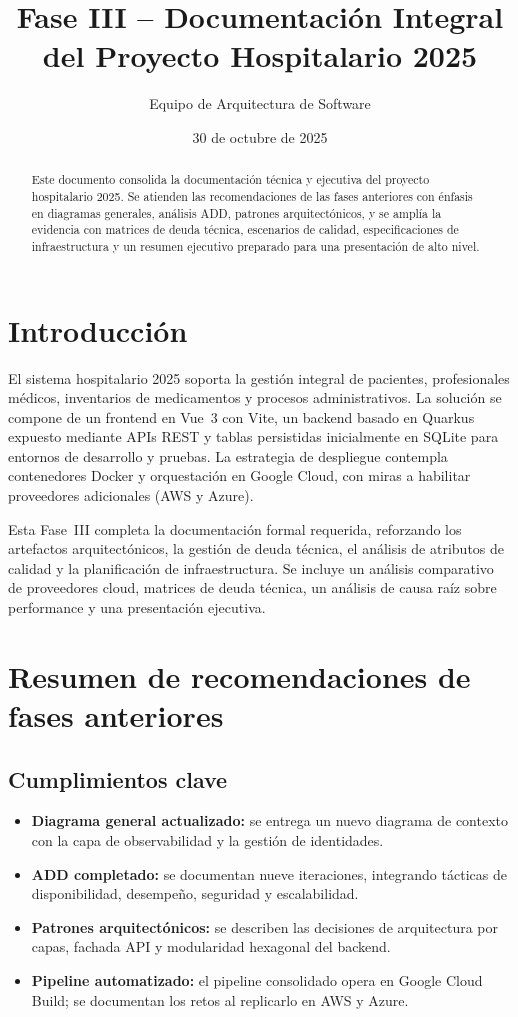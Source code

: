 \documentclass[12pt,letterpaper]{article}
\title{\textbf{Fase III -- Documentación Integral del Proyecto Hospitalario 2025}}
\author{Equipo de Arquitectura de Software}
\date{30 de octubre de 2025}
\begin{document}
\maketitle

\begin{abstract}
Este documento consolida la documentación técnica y ejecutiva del proyecto hospitalario 2025. Se atienden las recomendaciones de las fases anteriores con énfasis en diagramas generales, análisis ADD, patrones arquitectónicos, y se amplía la evidencia con matrices de deuda técnica, escenarios de calidad, especificaciones de infraestructura y un resumen ejecutivo preparado para una presentación de alto nivel.
\end{abstract}

\tableofcontents
\newpage

\section{Introducción}
El sistema hospitalario 2025 soporta la gestión integral de pacientes, profesionales médicos, inventarios de medicamentos y procesos administrativos. La solución se compone de un frontend en Vue~3 con Vite, un backend basado en Quarkus expuesto mediante APIs REST y tablas persistidas inicialmente en SQLite para entornos de desarrollo y pruebas. La estrategia de despliegue contempla contenedores Docker y orquestación en Google Cloud, con miras a habilitar proveedores adicionales (AWS y Azure).

Esta Fase~III completa la documentación formal requerida, reforzando los artefactos arquitectónicos, la gestión de deuda técnica, el análisis de atributos de calidad y la planificación de infraestructura. Se incluye un análisis comparativo de proveedores cloud, matrices de deuda técnica, un análisis de causa raíz sobre performance y una presentación ejecutiva.

\section{Resumen de recomendaciones de fases anteriores}
\subsection{Cumplimientos clave}
\begin{itemize}[leftmargin=1.2cm]
  \item \textbf{Diagrama general actualizado:} se entrega un nuevo diagrama de contexto con la capa de observabilidad y la gestión de identidades.
  \item \textbf{ADD completado:} se documentan nueve iteraciones, integrando tácticas de disponibilidad, desempeño, seguridad y escalabilidad.
  \item \textbf{Patrones arquitectónicos:} se describen las decisiones de arquitectura por capas, fachada API y modularidad hexagonal del backend.
  \item \textbf{Pipeline automatizado:} el pipeline consolidado opera en Google Cloud Build; se documentan los retos al replicarlo en AWS y Azure.
\end{itemize}
\end{document}
